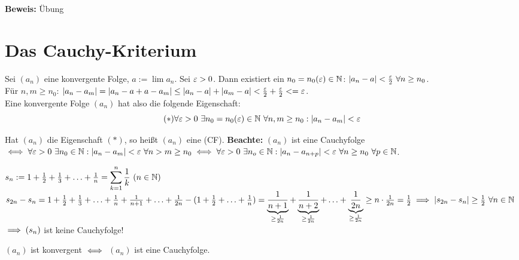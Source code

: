 \documentclass[a4paper,twoside,DIV15,BCOR12mm]{scrbook}
\begin{document}
\textbf{Beweis:} Übung

\chapter{Das Cauchy-Kriterium}

\begin{motivation}
Sei $(a_n)$ eine konvergente Folge, $a:= \lim a_n$. Sei $\varepsilon >0$. Dann existiert ein $n_0 = n_0(\varepsilon) \in \mathbb{N}$: $|a_n - a| < \frac{\varepsilon}{2} \ \forall n \ge n_0$.\\
Für $n,m\ge n_0$: $|a_n - a_m| = |a_n - a + a - a_m| \le |a_n -a| + |a_m -a| < \frac{\varepsilon}{2} + \frac{\varepsilon}{2} <= \varepsilon$.\\
Eine konvergente Folge $(a_n)$ hat also die folgende Eigenschaft:
$$(*) \forall \varepsilon > 0 \ \exists n_0 = n_0(\varepsilon) \in \mathbb{N} \ \forall n,m \ge n_0: |a_n-a_m| < \varepsilon$$
\end{motivation}

\begin{definition}
Hat $(a_n)$ die Eigenschaft $(*)$, so heißt $(a_n)$ eine  (CF).
\textbf{Beachte:} $(a_n)$ ist eine Cauchyfolge $\iff \forall \varepsilon > 0 \ \exists n_0 \in\mathbb{N}: |a_n-a_m| < \varepsilon \ \forall n>m\ge n_0 \iff \forall \varepsilon >0 \ \exists n_o\in\mathbb{N}: |a_n - a_{n+p}| < \varepsilon \ \forall n\ge n_0 \ \forall p \in\mathbb{N}$.
\end{definition}

\begin{beispiel}
$s_n := 1 + \frac{1}{2} + \frac{1}{3} + \ldots + \frac{1}{n} = \displaystyle\sum_{k=1}^n \frac{1}{k} \ (n\in\MdN)$\\
$s_{2n} - s_n = 1 + \frac{1}{2} + \frac{1}{3} + \ldots + \frac{1}{n} + \frac{1}{n+1} + \ldots + \frac{1}{2n} - (1+ \frac{1}{2} + \ldots + \frac{1}{n}) =  \underbrace{\frac{1}{n+1}}_{\ge\frac{1}{2n}} + \underbrace{\frac{1}{n+2}}_{\ge\frac{1}{2n}} + \ldots + \underbrace{\frac{1}{2n}}_{\ge \frac{1}{2n}} \ge n \cdot \frac{1}{2n} = \frac{1}{2} \implies |s_{2n} - s_n| \ge \frac{1}{2} \ \forall n\in\mathbb{N}$
$\implies (s_n)$ ist keine Cauchyfolge!
\end{beispiel}

\begin{satz}
$(a_n)$ ist konvergent $\iff$ $(a_n)$ ist eine Cauchyfolge.
\end{satz}
\end{document}
